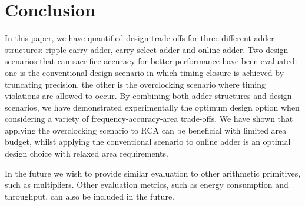 \documentclass[10pt, conference, compsocconf]{IEEEtran}
\begin{document}
\section{Conclusion}\label{sec:conclusion}
In this paper, we have quantified design trade-offs for three different adder structures: ripple carry adder, carry select adder and online adder. Two design scenarios that can sacrifice accuracy for better performance have been evaluated: one is the conventional design scenario in which timing closure is achieved by truncating precision, the other is the overclocking scenario where timing violations are allowed to occur. By combining both adder structures and design scenarios, we have demonstrated experimentally the optimum design option when considering a variety of frequency-accuracy-area trade-offs. We have shown that applying the overclocking scenario to RCA can be beneficial with limited area budget, whilst applying the conventional scenario to online adder is an optimal design choice with relaxed area requirements.

In the future we wish to provide similar evaluation to other arithmetic primitives, such as multipliers. Other evaluation metrics, such as energy consumption and throughput, can also be included in the future.







\end{document}

